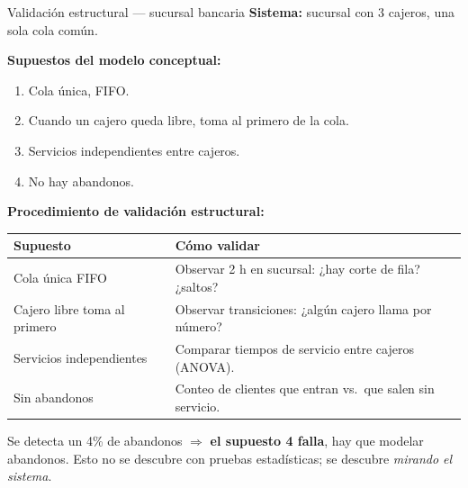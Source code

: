 \documentclass[aspectratio=1610, 10pt]{beamer}
\begin{document}
\begin{frame}{Validación estructural — sucursal bancaria}
  \footnotesize
  \textbf{Sistema:} sucursal con 3 cajeros, una sola cola común.

  \vspace{2pt}
  \textbf{Supuestos del modelo conceptual:}
  \begin{enumerate}\itemsep0pt
    \item Cola única, FIFO.
    \item Cuando un cajero queda libre, toma al primero de la cola.
    \item Servicios independientes entre cajeros.
    \item No hay abandonos.
  \end{enumerate}

  \vspace{4pt}
  \textbf{Procedimiento de validación estructural:}
  \begin{center}
    \renewcommand{\arraystretch}{1.2}
    \begin{tabular}{p{4.5cm} p{8.5cm}}
      \toprule
      \textbf{Supuesto} & \textbf{Cómo validar} \\
      \midrule
      Cola única FIFO          & Observar 2 h en sucursal: ¿hay corte de fila?
                                 ¿saltos? \\
      Cajero libre toma al primero
                               & Observar transiciones: ¿algún cajero llama por
                                 número? \\
      Servicios independientes & Comparar tiempos de servicio entre cajeros
                                 (ANOVA). \\
      Sin abandonos            & Conteo de clientes que entran vs.\ que salen
                                 sin servicio. \\
      \bottomrule
    \end{tabular}
  \end{center}

  \vspace{4pt}
  \begin{alertabox}
    \footnotesize
    Se detecta un 4\% de abandonos $\Rightarrow$ \textbf{el supuesto 4 falla},
    hay que modelar abandonos. Esto no se descubre con pruebas estadísticas;
    se descubre \emph{mirando el sistema}.
  \end{alertabox}
\end{frame}
\end{document}
